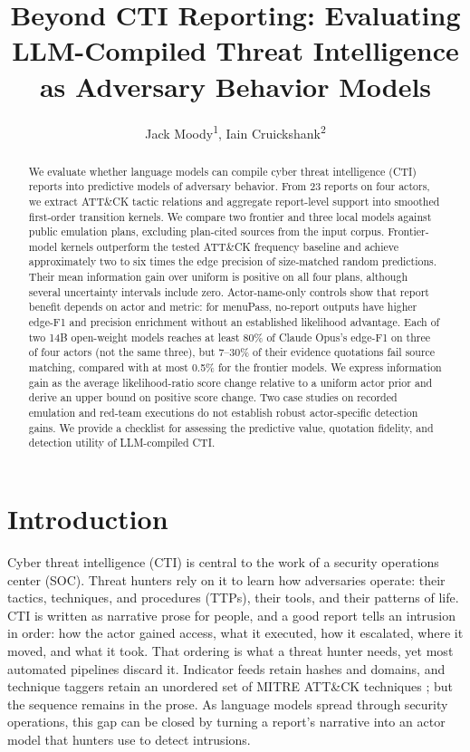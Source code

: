 \documentclass[letterpaper]{article}
\title{Beyond CTI Reporting: Evaluating LLM-Compiled Threat Intelligence as Adversary Behavior Models}
\author{
    Jack Moody\textsuperscript{\rm 1},
    Iain Cruickshank\textsuperscript{\rm 2}
}
\newif\ifflags
\newcommand{\flag}[1]{\ifflags\textcolor{red}{\textsuperscript{\textbf{[#1]}}}\fi}
\begin{document}
\maketitle

\begin{abstract}
We evaluate whether language models can compile cyber threat intelligence (CTI) reports into predictive models of adversary behavior. From 23 reports on four actors, we extract ATT\&CK tactic relations and aggregate report-level support into smoothed first-order transition kernels. We compare two frontier and three local models against public emulation plans, excluding plan-cited sources from the input corpus. Frontier-model kernels outperform the tested ATT\&CK frequency baseline and achieve approximately two to six times the edge precision of size-matched random predictions. Their mean information gain over uniform is positive on all four plans, although several uncertainty intervals include zero. Actor-name-only controls show that report benefit depends on actor and metric: for menuPass, no-report outputs have higher edge-F1 and precision enrichment without an established likelihood advantage. Each of two 14B open-weight models reaches at least 80\% of Claude Opus's edge-F1 on three of four actors (not the same three), but 7--30\% of their evidence quotations fail source matching, compared with at most 0.5\% for the frontier models. We express information gain as the average likelihood-ratio score change relative to a uniform actor prior and derive an upper bound on positive score change. Two case studies on recorded emulation and red-team executions do not establish robust actor-specific detection gains. We provide a checklist for assessing the predictive value, quotation fidelity, and detection utility of LLM-compiled CTI.
\end{abstract}

\section{Introduction}

Cyber threat intelligence (CTI) is central to the work of a security operations center (SOC). Threat hunters rely on it to learn how adversaries operate: their tactics, techniques, and procedures (TTPs), their tools, and their patterns of life. CTI is written as narrative prose for people, and a good report tells an intrusion in order: how the actor gained access, what it executed, how it escalated, where it moved, and what it took. That ordering is what a threat hunter needs, yet most automated pipelines discard it.\flag{F2} Indicator feeds retain hashes and domains, and technique taggers retain an unordered set of MITRE ATT\&CK techniques \citep{strom2018attack}; but the sequence remains in the prose. As language models spread through security operations, this gap can be closed by turning a report's narrative into an actor model that hunters use to detect intrusions.
\end{document}
